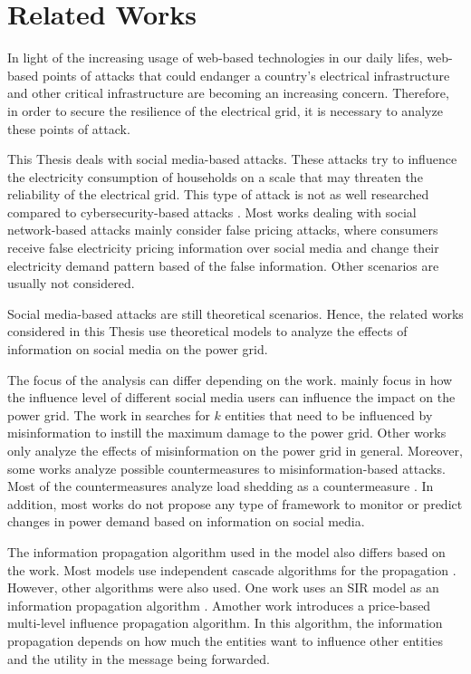 \chapter{Related Works}
\label{relatedworks}
In light of the increasing usage of web-based technologies in our daily 
lifes, web-based points of attacks that could endanger a country's 
electrical infrastructure and other critical infrastructure 
are becoming an increasing concern.
Therefore, in order to secure the resilience of the electrical grid,
it is necessary to analyze these points of attack.

This Thesis deals with social media-based
attacks. These attacks try to 
influence the electricity consumption of households 
on a scale that may threaten the reliability
of the electrical grid. 
This type of attack is not as well researched 
compared to cybersecurity-based attacks
\cite{sun2018cyber}. 
Most works dealing with social network-based
attacks mainly consider false pricing attacks, where consumers receive false 
electricity pricing information over social media and change their 
electricity demand pattern based of the false information.
Other scenarios are usually not considered.

Social media-based attacks are still theoretical scenarios.
Hence, the related works considered in this Thesis use theoretical
models to analyze the effects of information on social media 
on the power grid.

The focus of the analysis can differ depending on the work.
\cite{vulnerabilityanalysis} mainly focus in how the influence 
level of different social media users can influence the 
impact on the power grid. The work in \cite{pan2017threat}
searches for $k$ entities that
need to be influenced by misinformation to instill 
the maximum damage to the power grid.
Other works only analyze the 
effects of misinformation on the power grid
in general.
Moreover, some works analyze possible countermeasures to misinformation-based
attacks. Most of the countermeasures analyze load shedding as a 
countermeasure \cite{pan2017threat} \cite{nguyen2019vulnerability}.
In addition, most works do not propose any type of framework to 
monitor or predict changes in power demand based on 
information on social media.

The information propagation algorithm used in the model also differs based
on the work.
Most models use independent cascade algorithms for the propagation
\cite{raman2020weaponizing} \cite{pan2017threat}
\cite{nguyen2019vulnerability}. 
However, other algorithms were also used. One work uses an SIR 
model as an information propagation algorithm 
\cite{jamalzadeh2022protecting}. Amother work 
\cite{vulnerabilityanalysis} introduces a price-based multi-level 
influence propagation algorithm. In this algorithm, the information
propagation depends on how much the entities want to influence other
entities and the utility in the message being forwarded. 

